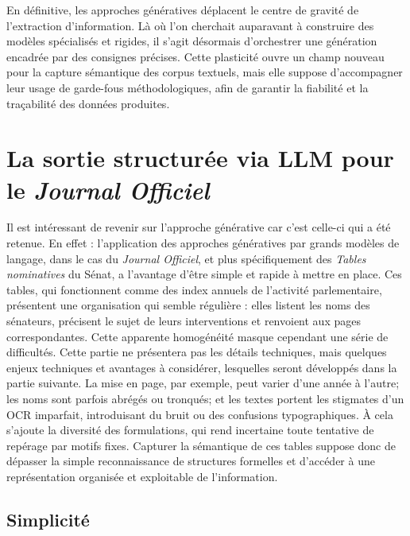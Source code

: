 En définitive, les approches génératives déplacent le centre de gravité de l’extraction d’information. Là où l’on cherchait auparavant à construire des modèles spécialisés et rigides, il s’agit désormais d’orchestrer une génération encadrée par des consignes précises. Cette plasticité ouvre un champ nouveau pour la capture sémantique des corpus textuels, mais elle suppose d’accompagner leur usage de garde-fous méthodologiques, afin de garantir la fiabilité et la traçabilité des données produites.

\section{La sortie structurée via LLM pour le \emph{Journal Officiel}}

Il est intéressant de revenir sur l'approche générative car c'est celle-ci qui a été retenue. En effet : l’application des approches génératives par grands modèles de langage, dans le cas du \emph{Journal Officiel}, et plus spécifiquement des \emph{Tables nominatives} du Sénat, a l'avantage d'être simple et rapide à mettre en place. Ces tables, qui fonctionnent comme des index annuels de l’activité parlementaire, présentent une organisation qui semble régulière : elles listent les noms des sénateurs, précisent le sujet de leurs interventions et renvoient aux pages correspondantes. Cette apparente homogénéité masque cependant une série de difficultés. Cette partie ne présentera pas les détails techniques, mais quelques enjeux techniques et avantages à considérer, lesquelles seront développés dans la partie suivante. La mise en page, par exemple, peut varier d’une année à l’autre; les noms sont parfois abrégés ou tronqués; et les textes portent les stigmates d’un OCR imparfait, introduisant du bruit ou des confusions typographiques. À cela s’ajoute la diversité des formulations, qui rend incertaine toute tentative de repérage par motifs fixes. Capturer la sémantique de ces tables suppose donc de dépasser la simple reconnaissance de structures formelles et d’accéder à une représentation organisée et exploitable de l’information.

\subsection{Simplicité}

